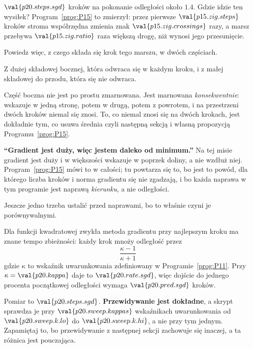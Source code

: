 \begin{fr}
$\val{p20.steps.sgd}$ kroków na pokonanie odległości około $\num{1.4}$. Gdzie
idzie ten wysiłek? Program~\ref{prog:P15} to zmierzył: przez pierwsze
$\val{p15.zig.steps}$ kroków stroma współrzędna zmienia znak
$\val{p15.zig.crossings}$ razy, a marsz przebywa $\val{p15.zig.ratio}$ raza
większą drogę, niż wynosi jego przesunięcie.

Powiedz więc, z czego składa się krok tego marszu, w dwóch częściach.
\nextframe
\end{fr}

\begin{fr}
\begin{ansblock}
Z dużej składowej bocznej, która odwraca się w każdym kroku, i z małej
składowej do przodu, która się nie odwraca.
\end{ansblock}

Część boczna nie jest po prostu zmarnowana. Jest marnowana
\emph{konsekwentnie}: wskazuje w jedną stronę, potem w drugą, potem z powrotem,
i na przestrzeni dwóch kroków niemal się znosi. To, co niemal znosi się na
dwóch krokach, jest dokładnie tym, co usuwa średnia \dash{} czyli następną
sekcją i własną propozycją Programu~\ref{prog:P15}.

\begin{trapbox}
\textbf{\enquote{Gradient jest duży, więc jestem daleko od minimum.}} Na tej
misie gradient jest duży i w większości wskazuje w poprzek doliny, a nie wzdłuż
niej. Program~\ref{prog:P15} mówi to w całości; tu powtarza się to, bo jest to
powód, dla którego liczba kroków i norma gradientu się nie zgadzają, i bo każda
naprawa w tym programie jest naprawą \emph{kierunku}, a nie odległości.
\end{trapbox}
\end{fr}

\begin{fr}
Jeszcze jedno trzeba ustalić przed naprawami, bo to właśnie czyni je
porównywalnymi.

Dla funkcji kwadratowej zwykła metoda gradientu przy najlepszym kroku ma znane
tempo zbieżności: każdy krok mnoży odległość przez
\[ \frac{\kappa - 1}{\kappa + 1} \]
gdzie $\kappa$ to wskaźnik uwarunkowania zdefiniowany w
Programie~\ref{prog:P11}. Przy $\kappa = \val{p20.kappa}$ daje to
$\val{p20.rate.sgd}$, więc dojście do jednego procenta początkowej odległości
wymaga $\val{p20.pred.sgd}$ kroków.

Pomiar to $\val{p20.steps.sgd}$. \textbf{Przewidywanie jest dokładne}, a skrypt
sprawdza je przy $\val{p20.sweep.kappas}$ wskaźnikach uwarunkowania od
$\val{p20.sweep.k.lo}$ do
$\val{p20.sweep.k.hi}$, a nie przy tym jednym. Zapamiętaj to, bo przewidywanie
z następnej sekcji zachowuje się inaczej, a ta różnica jest pouczająca.
\end{fr}

